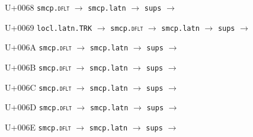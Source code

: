 \documentclass{article}
\begin{document}
\begin{substitutions}
\goodbreak

U+0068  \linebreak
    \texttt{smcp.\textsc{dflt}} $\to$  \linebreak
    \texttt{smcp.latn} $\to$  \linebreak
    \texttt{sups} $\to$  

\goodbreak

U+0069  \linebreak
    \texttt{locl.latn.TRK} $\to$  \linebreak
    \texttt{smcp.\textsc{dflt}} $\to$  \linebreak
    \texttt{smcp.latn} $\to$  \linebreak
    \texttt{sups} $\to$  

\goodbreak

U+006A  \linebreak
    \texttt{smcp.\textsc{dflt}} $\to$  \linebreak
    \texttt{smcp.latn} $\to$  \linebreak
    \texttt{sups} $\to$  

\goodbreak

U+006B  \linebreak
    \texttt{smcp.\textsc{dflt}} $\to$  \linebreak
    \texttt{smcp.latn} $\to$  \linebreak
    \texttt{sups} $\to$  

\goodbreak

U+006C  \linebreak
    \texttt{smcp.\textsc{dflt}} $\to$  \linebreak
    \texttt{smcp.latn} $\to$  \linebreak
    \texttt{sups} $\to$  

\goodbreak

U+006D  \linebreak
    \texttt{smcp.\textsc{dflt}} $\to$  \linebreak
    \texttt{smcp.latn} $\to$  \linebreak
    \texttt{sups} $\to$  

\goodbreak

U+006E  \linebreak
    \texttt{smcp.\textsc{dflt}} $\to$  \linebreak
    \texttt{smcp.latn} $\to$  \linebreak
    \texttt{sups} $\to$  


\end{substitutions}
\end{document}
